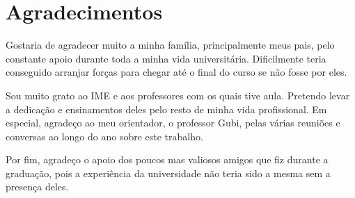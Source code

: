 \chapter*{Agradecimentos}

Gostaria de agradecer muito a minha família, principalmente meus pais, pelo constante apoio durante toda a minha vida universitária. Dificilmente teria conseguido arranjar forças para chegar até o final do curso se não fosse por eles.

Sou muito grato ao IME e aos professores com os quais tive aula. Pretendo levar a dedicação e ensinamentos deles pelo resto de minha vida profissional. Em especial, agradeço ao meu orientador, o professor Gubi, pelas várias reuniões e conversas ao longo do ano sobre este trabalho.

Por fim, agradeço o apoio dos poucos mas valiosos amigos que fiz durante a graduação, pois a experiência da universidade não teria sido a mesma sem a presença deles.
